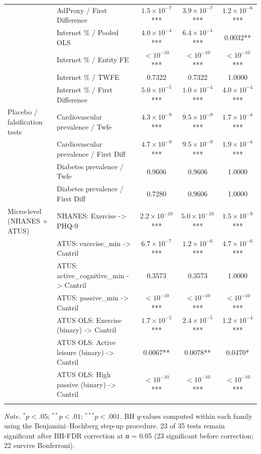 \begin{table}[htbp]
\begin{tabular}{llccc}
   & AdProxy / First Difference & $1.5 \times 10^{-7}$*** & $3.9 \times 10^{-7}$*** & $1.2 \times 10^{-6}$*** \\
   & Internet \% / Pooled OLS & $4.0 \times 10^{-4}$*** & $6.4 \times 10^{-4}$*** & 0.0032** \\
   & Internet \% / Entity FE & $< 10^{-10}$*** & $< 10^{-10}$*** & $< 10^{-10}$*** \\
   & Internet \% / TWFE & 0.7322 & 0.7322 & 1.0000 \\
   & Internet \% / First Difference & $5.0 \times 10^{-5}$*** & $1.0 \times 10^{-4}$*** & $4.0 \times 10^{-4}$*** \\
\addlinespace
  Placebo / falsification tests & Cardiovascular prevalence / Twfe & $4.3 \times 10^{-9}$*** & $9.5 \times 10^{-9}$*** & $1.7 \times 10^{-8}$*** \\
   & Cardiovascular prevalence / First Diff & $4.7 \times 10^{-9}$*** & $9.5 \times 10^{-9}$*** & $1.9 \times 10^{-8}$*** \\
   & Diabetes prevalence / Twfe & 0.9606 & 0.9606 & 1.0000 \\
   & Diabetes prevalence / First Diff & 0.7280 & 0.9606 & 1.0000 \\
\addlinespace
  Micro-level (NHANES + ATUS) & NHANES: Exercise -> PHQ-9 & $2.2 \times 10^{-10}$*** & $5.0 \times 10^{-10}$*** & $1.5 \times 10^{-9}$*** \\
   & ATUS: exercise\_min -> Cantril & $6.7 \times 10^{-7}$*** & $1.2 \times 10^{-6}$*** & $4.7 \times 10^{-6}$*** \\
   & ATUS: active\_cognitive\_min -> Cantril & 0.3573 & 0.3573 & 1.0000 \\
   & ATUS: passive\_min -> Cantril & $< 10^{-10}$*** & $< 10^{-10}$*** & $< 10^{-10}$*** \\
   & ATUS OLS: Exercise (binary) -> Cantril & $1.7 \times 10^{-5}$*** & $2.4 \times 10^{-5}$*** & $1.2 \times 10^{-4}$*** \\
   & ATUS OLS: Active leisure (binary) -> Cantril & 0.0067** & 0.0078** & 0.0470* \\
   & ATUS OLS: High passive (binary) -> Cantril & $< 10^{-10}$*** & $< 10^{-10}$*** & $< 10^{-10}$*** \\
\addlinespace
\bottomrule
\end{tabular}
\par\smallskip\noindent\textit{Note.} $^{*}p<.05$; $^{**}p<.01$; $^{***}p<.001$. BH $q$-values computed within each family using the Benjamini--Hochberg step-up procedure. 23 of 35 tests remain significant after BH-FDR correction at α = 0.05 (23 significant before correction; 22 survive Bonferroni).
\end{table}